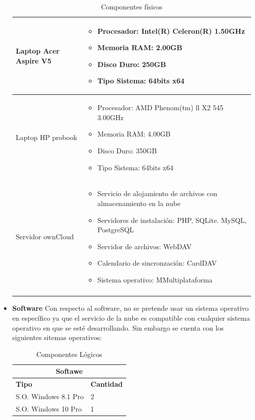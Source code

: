 \begin{itemize}
\begin{longtable}{ |  p{5cm} |  p{10.5cm} |}
Laptop Acer Aspire V5 &  \begin{itemize}
				\item Procesador: Intel(R) Celeron(R)  1.50GHz 
				\item Memoria RAM: 2.00GB
				\item Disco Duro: 250GB
				\item Tipo Sistema: 64bits x64
			      \end{itemize} \\ \hline

Laptop HP probook &  \begin{itemize}
				\item Procesador: AMD Phenom(tm) ll X2 545  3.00GHz 
				\item Memoria RAM: 4.00GB
				\item Disco Duro: 350GB
				\item Tipo Sistema: 64bits x64
			      \end{itemize} \\ \hline

Servidor ownCloud &  \begin{itemize}
				\item Servicio de alojamiento de archivos con almacenamiento en la nube
				\item Servidores de instalación: PHP, SQLite. MySQL, PostgreSQL
				\item Servidor de archivos: WebDAV
				\item Calendario de sincronzación: CardDAV
				\item Sistema operativo: MMultiplataforma
			      \end{itemize} \\ \hline
\caption{Componentes físicos}
\label{Hardware}
\end{longtable}

	\item \textbf{Software}
Con respecto al software, no se pretende usar un sistema operativo en específico ya que el servicio de la nube es compatible con cualquier sistema operativo en que se esté desarrollando. Sin embargo se cuenta con los siguientes sitemas operativos: 

\begin{table}[htb]
\centering
\begin{tabular}{| p{5cm} |  p{10.5cm} |}
\hline
\multicolumn{2}{|c|}{\textbf{Softawe}} \\ \hline
\textbf{Tipo} &  \textbf{Cantidad} \\
\hline \hline
S.O. Windows 8.1 Pro & 2\\ \hline
S.O. Windows 10 Pro & 1\\ \hline

\end{tabular}
\caption{Componentes Lógicos}
\label{Servidor de Llaves }
\end{table}
\end{itemize}



